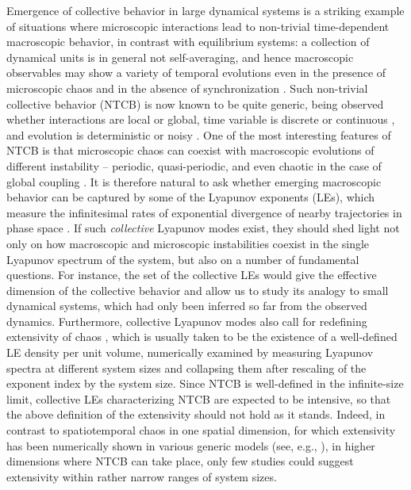 \documentclass[12pt]{iopart}
\begin{document}
Emergence of collective behavior in large dynamical systems
 is a striking example of situations where microscopic interactions
 lead to non-trivial time-dependent macroscopic behavior,
 in contrast with equilibrium systems:
 a collection of dynamical units is in general not self-averaging,
 and hence macroscopic observables may
 show a variety of temporal evolutions
 even in the presence of microscopic chaos and in the absence of synchronization
 \cite{Chate.Manneville-PTP1992,Kaneko-PRL1990,Pikovsky.Kurths-PRL1994,Kaneko-PD1995}.
Such non-trivial collective behavior (NTCB) is now known to be quite generic,
 being observed whether interactions are local or global,
 time variable is discrete or continuous
 \cite{Hakim.Rappel-PRA1992,Nakagawa.Kuramoto-PTP1993,Nakagawa.Kuramoto-PD1995,Brunnet.etal-PD1994},
 and evolution is deterministic or noisy
 \cite{Shibata.etal-PRL1999,DeMonte.etal-PRL2004,DeMonte.etal-PTPS2006}.
One of the most interesting features of NTCB
 is that microscopic chaos can coexist with macroscopic evolutions
 of different instability -- periodic, quasi-periodic, and even chaotic
 in the case of global coupling \cite{Bohr.etal-PRL1987,Kaneko-PD1995}.
It is therefore natural to ask whether emerging macroscopic behavior
 can be captured by some of the Lyapunov exponents (LEs),
 which measure the infinitesimal rates of exponential divergence
 of nearby trajectories in phase space \cite{Eckmann.Ruelle-RMP1985}.
If such \textit{collective} Lyapunov modes exist,
 they should shed light not only on
 how macroscopic and microscopic instabilities coexist
 in the single Lyapunov spectrum of the system,
 but also on a number of fundamental questions.
For instance, the set of the collective LEs
 would give the effective dimension of the collective behavior
 and allow us to study its analogy to small dynamical systems,
 which had only been inferred so far from the observed dynamics.
Furthermore, collective Lyapunov modes also call for redefining
 extensivity of chaos \cite{Ruelle-CMP1982},
 which is usually taken to be the existence of a well-defined LE density
 per unit volume, numerically examined by measuring Lyapunov spectra
 at different system sizes and collapsing them after rescaling
 of the exponent index by the system size.
Since NTCB is well-defined in the infinite-size limit,
 collective LEs characterizing NTCB are expected to be intensive,
 so that the above definition of the extensivity should not hold as it stands.
Indeed, in contrast to spatiotemporal chaos in one spatial dimension,
 for which extensivity has been numerically shown in various generic models
 (see, e.g., \cite{Manneville-LNP1985,Keefe-PLA1989,Livi.etal-JPA1986}),
 in higher dimensions where NTCB can take place,
 only few studies could suggest extensivity
 \cite{OHern.etal-PRE1996,Egolf.etal-N2000}
 within rather narrow ranges of system sizes.
\end{document}
